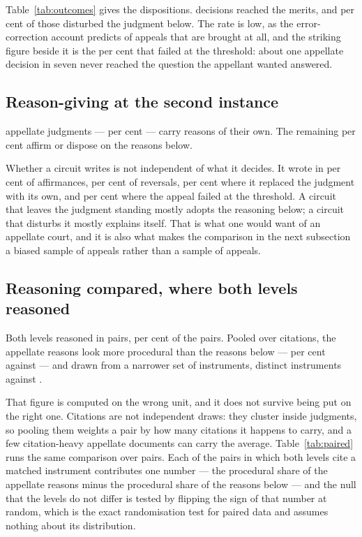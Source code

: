 \documentclass[11pt]{article}
\begin{document}
Table~\ref{tab:outcomes} gives the dispositions. \nDecidedOnMerits{}
decisions reached the merits, and \nDisturbedShare{} per cent of those
disturbed the judgment below. The rate is low, as the error-correction
account predicts of appeals that are brought at all, and the striking figure
beside it is the \nNotAdmittedShare{} per cent that failed at the threshold:
about one appellate decision in seven never reached the question the appellant
wanted answered.

\subsection{Reason-giving at the second instance}

\nOwnReasons{} appellate judgments --- \nOwnReasonsShare{} per cent --- carry
reasons of their own. The remaining \nNoReasonsShare{} per cent affirm or
dispose on the reasons below.

Whether a circuit writes is not independent of what it decides. It wrote in
\nWroteAffirming{} per cent of affirmances, \nWroteReversing{} per cent of
reversals, \nWroteSubstituting{} per cent where it replaced the judgment with
its own, and \nWroteNotAdmitting{} per cent where the appeal failed at the
threshold. A circuit that leaves the judgment standing mostly adopts the
reasoning below; a circuit that disturbs it mostly explains itself. That is
what one would want of an appellate court, and it is also what makes the
comparison in the next subsection a biased sample of appeals rather than a
sample of appeals.

\subsection{Reasoning compared, where both levels reasoned}

Both levels reasoned in \nBothReasoned{} pairs, \nBothReasonedShare{} per
cent of the pairs. Pooled over citations, the appellate reasons look more
procedural than the reasons below --- \nAppealProcedural{} per cent against
\nFirstProcedural{} --- and drawn from a narrower set of instruments,
\nAppealInstruments{} distinct instruments against \nFirstInstruments{}.

That figure is computed on the wrong unit, and it does not survive being put
on the right one. Citations are not independent draws: they cluster inside
judgments, so pooling them weights a pair by how many citations it happens to
carry, and a few citation-heavy appellate documents can carry the average.
Table~\ref{tab:paired} runs the same comparison over pairs. Each of the
\nPairsTested{} pairs in which both levels cite a matched instrument
contributes one number --- the procedural share of the appellate reasons minus
the procedural share of the reasons below --- and the null that the levels do
not differ is tested by flipping the sign of that number at random, which is
the exact randomisation test for paired data and assumes nothing about its
distribution.
\end{document}
